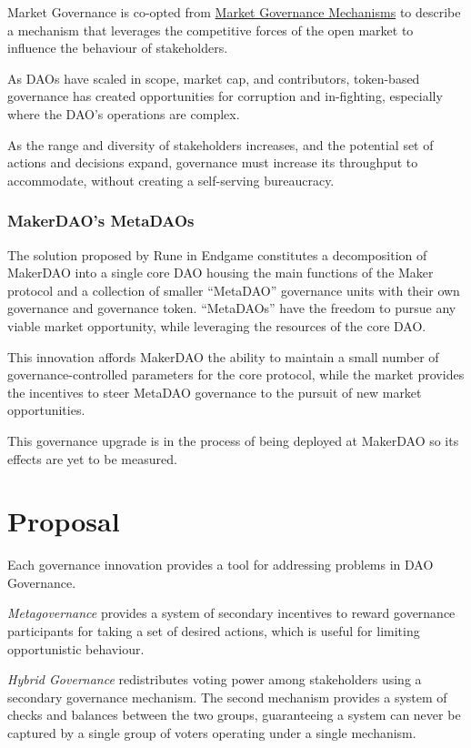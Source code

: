 \documentclass[
]{article}
\begin{document}
Market Governance is co-opted from
\href{https://en.wikipedia.org/wiki/Market_governance_mechanism}{Market
Governance Mechanisms} to describe a mechanism that leverages the
competitive forces of the open market to influence the behaviour of
stakeholders.

As DAOs have scaled in scope, market cap, and contributors, token-based
governance has created opportunities for corruption and in-fighting,
especially where the DAO's operations are complex.

As the range and diversity of stakeholders increases, and the potential
set of actions and decisions expand, governance must increase its
throughput to accommodate, without creating a self-serving bureaucracy.

\hypertarget{makerdaos-metadaos}{%
\subsubsection{MakerDAO's MetaDAOs}\label{makerdaos-metadaos}}

The solution proposed by Rune in Endgame constitutes a decomposition of
MakerDAO into a single core DAO housing the main functions of the Maker
protocol and a collection of smaller ``MetaDAO'' governance units with
their own governance and governance token. ``MetaDAOs'' have the freedom
to pursue any viable market opportunity, while leveraging the resources
of the core DAO.

This innovation affords MakerDAO the ability to maintain a small number
of governance-controlled parameters for the core protocol, while the
market provides the incentives to steer MetaDAO governance to the
pursuit of new market opportunities.

This governance upgrade is in the process of being deployed at MakerDAO
so its effects are yet to be measured.
\hypertarget{proposal}{%
\section{Proposal}\label{proposal}}

Each governance innovation provides a tool for addressing problems in
DAO Governance.

\emph{Metagovernance} provides a system of secondary incentives to
reward governance participants for taking a set of desired actions,
which is useful for limiting opportunistic behaviour.

\emph{Hybrid Governance} redistributes voting power among stakeholders
using a secondary governance mechanism. The second mechanism provides a
system of checks and balances between the two groups, guaranteeing a
system can never be captured by a single group of voters operating under
a single mechanism.
\end{document}
